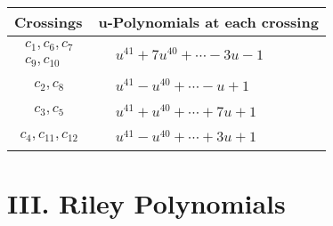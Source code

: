 \documentclass[1p]{elsarticle_modified}
\theoremstyle{definition}
\begin{document}
\begin{tabular}{m{50pt}|m{274pt}}
Crossings & \hspace{64pt}u-Polynomials at each crossing \\
\hline $$\begin{aligned}c_{1},c_{6},c_{7}\\c_{9},c_{10}\end{aligned}$$&$\begin{aligned}
&u^{41}+7 u^{40}+\cdots-3 u-1
\end{aligned}$\\
\hline $$\begin{aligned}c_{2},c_{8}\end{aligned}$$&$\begin{aligned}
&u^{41}- u^{40}+\cdots- u+1
\end{aligned}$\\
\hline $$\begin{aligned}c_{3},c_{5}\end{aligned}$$&$\begin{aligned}
&u^{41}+u^{40}+\cdots+7 u+1
\end{aligned}$\\
\hline $$\begin{aligned}c_{4},c_{11},c_{12}\end{aligned}$$&$\begin{aligned}
&u^{41}- u^{40}+\cdots+3 u+1
\end{aligned}$\\
\hline
\end{tabular}\newpage\renewcommand{\arraystretch}{1}
\centering \section*{ III. Riley Polynomials}
\end{document}
